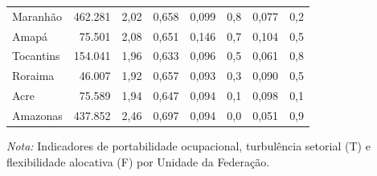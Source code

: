 {\begin{tabular}{lrrrrrrr}
Maranhão & 462.281 & 2,02 & 0,658 & 0,099 & 0,8 & 0,077 & 0,2 \\
Amapá & 75.501 & 2,08 & 0,651 & 0,146 & 0,7 & 0,104 & 0,5 \\
Tocantins & 154.041 & 1,96 & 0,633 & 0,096 & 0,5 & 0,061 & 0,8 \\
Roraima & 46.007 & 1,92 & 0,657 & 0,093 & 0,3 & 0,090 & 0,5 \\
Acre & 75.589 & 1,94 & 0,647 & 0,094 & 0,1 & 0,098 & 0,1 \\
Amazonas & 437.852 & 2,46 & 0,697 & 0,094 & 0,0 & 0,051 & 0,9 \\
\bottomrule
\end{tabular}
\vspace{2pt}
\par{\footnotesize \textit{Nota:} Indicadores de portabilidade ocupacional, turbulência setorial (T) e flexibilidade alocativa (F) por Unidade da Federação.}
}
